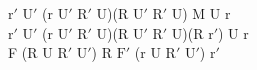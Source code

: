 $\text{r}'$ $\text{U}'$ (r $\text{U}'$ $\text{R}'$ U)(R $\text{U}'$ $\text{R}'$ U) M U r\\
$\text{r}'$ $\text{U}'$ (r $\text{U}'$ $\text{R}'$ U)(R $\text{U}'$ $\text{R}'$ U)(R $\text{r}'$) U r\\
F (R U $\text{R}'$ $\text{U}'$) R $\text{F}'$ (r U $\text{R}'$ $\text{U}'$) $\text{r}'$\\
